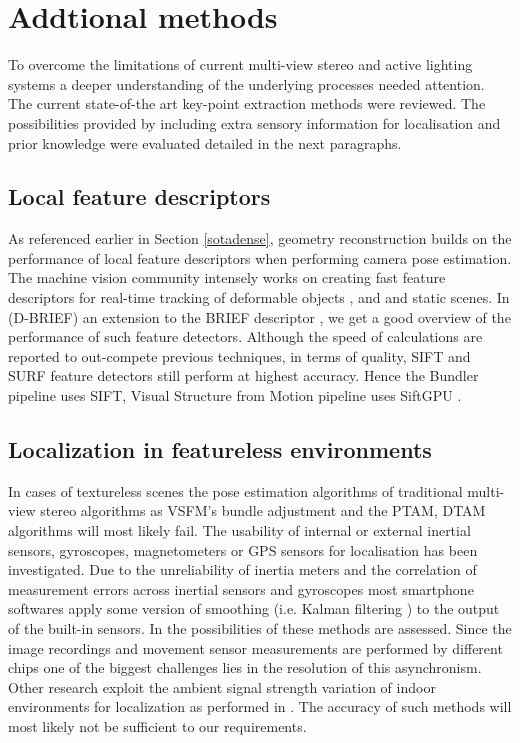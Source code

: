 \documentclass{ucl_thesis}
\begin{document}
\section{Addtional methods}

\par To overcome the limitations of current multi-view stereo and active lighting systems a deeper understanding of the underlying processes needed attention. The current state-of-the art key-point extraction methods were reviewed. The possibilities provided by including extra sensory information for localisation and prior knowledge were evaluated detailed in the next paragraphs.

\subsection{Local feature descriptors} 
\label{section:featdesc}
As referenced earlier in Section \ref{sotadense}, geometry reconstruction builds on the performance of local feature descriptors when performing camera pose estimation. The machine vision community intensely works on creating fast feature descriptors for real-time tracking of deformable objects \cite{RussellFA12}, \cite{DBLP:dblp_conf/ismar/RoussosRGA12} and \cite{DBLP:dblp_conf/eccv/VicenteA12} and static scenes. In \cite{trzcinskiefficient} (D-BRIEF) an extension to the BRIEF descriptor \cite{calonder2010brief}, we get a good overview of the performance of such feature detectors. Although the speed of calculations are reported to out-compete previous techniques, in terms of quality, SIFT \cite{Lowe04} and SURF \cite{BayTG06} feature detectors still perform at highest accuracy. Hence the Bundler pipeline uses SIFT, Visual Structure from Motion pipeline uses SiftGPU \cite{siftgpu07wu}.

\subsection{Localization in featureless environments}
In cases of textureless scenes the pose estimation algorithms of traditional multi-view stereo algorithms as VSFM's bundle adjustment and the PTAM, DTAM algorithms will most likely fail. The usability of internal or external inertial sensors, gyroscopes, magnetometers or GPS sensors for localisation has been investigated. Due to the unreliability of inertia meters and the correlation of measurement errors across inertial sensors and gyroscopes most smartphone softwares apply some version of smoothing (i.e. Kalman filtering \cite{kalman}) to the output of the built-in sensors. In \cite{HolzmannH12} the possibilities of these methods are assessed. Since the image recordings and movement sensor measurements are performed by different chips one of the biggest challenges lies in the resolution of this asynchronism. Other research exploit the ambient signal strength variation of indoor environments for localization as performed in \cite{xiong2011arraytrack}. The accuracy of such methods will most likely not be sufficient to our requirements.
\end{document}

